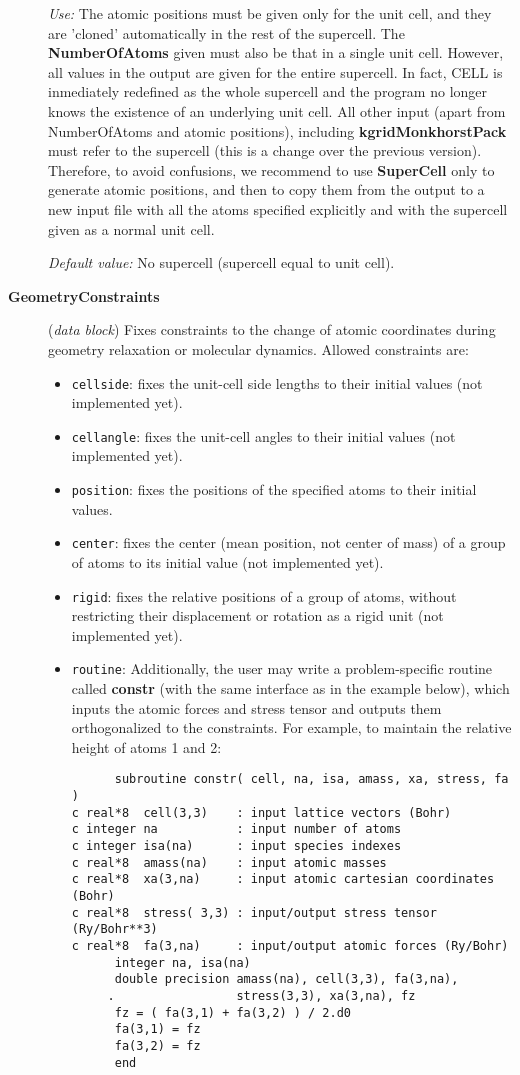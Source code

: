 \begin{description}
{\it Use:} The atomic positions must be given only for the unit cell,
and they are 'cloned' automatically in the rest of the supercell.
The {\bf NumberOfAtoms} given must also be that in a single unit cell.
However, all values in the output are given for the entire supercell. 
In fact, CELL is inmediately redefined as the whole supercell and the 
program no longer knows the existence of an underlying unit cell.
All other input (apart from NumberOfAtoms and atomic positions), 
including {\bf kgridMonkhorstPack} must refer to the supercell 
(this is a change over the previous version). Therefore, to avoid
confusions, we recommend to use {\bf SuperCell} only to
generate atomic positions, and then to copy them from the output
to a new input file with all the atoms specified explicitly and
with the supercell given as a normal unit cell.

{\it Default value:} No supercell (supercell equal to unit cell).


\item[{\bf GeometryConstraints}] ({\it data block}) 
Fixes constraints to the change of atomic coordinates during
geometry relaxation or molecular dynamics. Allowed constraints are:
\begin{itemize}
\item {\tt cellside}: fixes the unit-cell side lengths to
their initial values (not implemented yet).
\item {\tt cellangle}: fixes the unit-cell angles to
their initial values (not implemented yet).
\item {\tt position}: fixes the positions of the specified atoms to
their initial values.
\item {\tt center}: fixes the center (mean position, not center of
mass) of a group of atoms to its initial value (not implemented yet).
\item {\tt rigid}: fixes the relative positions of a group of atoms,
without restricting their displacement or rotation as a rigid unit
(not implemented yet).
\item {\tt routine}: Additionally, the user may write a 
problem-specific routine called {\bf constr} (with the same 
interface as in the example below), which inputs the atomic
forces and stress tensor and outputs them orthogonalized to the
constraints. For example, to maintain the relative height of 
atoms 1 and 2:

\begin{verbatim}
      subroutine constr( cell, na, isa, amass, xa, stress, fa )
c real*8  cell(3,3)    : input lattice vectors (Bohr)
c integer na           : input number of atoms
c integer isa(na)      : input species indexes
c real*8  amass(na)    : input atomic masses
c real*8  xa(3,na)     : input atomic cartesian coordinates (Bohr)
c real*8  stress( 3,3) : input/output stress tensor (Ry/Bohr**3)
c real*8  fa(3,na)     : input/output atomic forces (Ry/Bohr)
      integer na, isa(na)
      double precision amass(na), cell(3,3), fa(3,na),
     .                 stress(3,3), xa(3,na), fz
      fz = ( fa(3,1) + fa(3,2) ) / 2.d0
      fa(3,1) = fz
      fa(3,2) = fz
      end
\end{verbatim}


\end{itemize}
\end{description}

